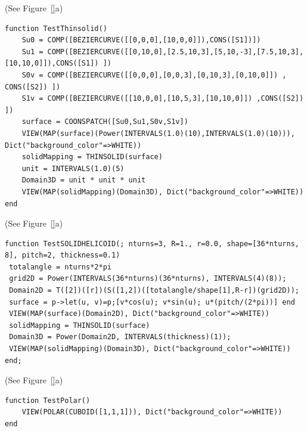 \begin{coding}[Algebraic computation of FE = $\delta_1$]
\begin{condition}[(aaaaaaa] (See Figure~\ref{}a)\
\begin{lstlisting}[language=JuliaLocal, style=julia, mathescape=true]
function TestThinsolid()
	Su0 = COMP([BEZIERCURVE([[0,0,0],[10,0,0]]),CONS([S1])])
	Su1 = COMP([BEZIERCURVE([[0,10,0],[2.5,10,3],[5,10,-3],[7.5,10,3],[10,10,0]]),CONS([S1]) ])
	S0v = COMP([BEZIERCURVE([[0,0,0],[0,0,3],[0,10,3],[0,10,0]]) , CONS([S2]) ]) 
	S1v = COMP([BEZIERCURVE([[10,0,0],[10,5,3],[10,10,0]]) ,CONS([S2]) ])
	surface = COONSPATCH([Su0,Su1,S0v,S1v])
	VIEW(MAP(surface)(Power(INTERVALS(1.0)(10),INTERVALS(1.0)(10))), Dict("background_color"=>WHITE))
	solidMapping = THINSOLID(surface)
	unit = INTERVALS(1.0)(5)
	Domain3D = unit * unit * unit
	VIEW(MAP(solidMapping)(Domain3D), Dict("background_color"=>WHITE))
end
\end{lstlisting}
\end{condition}

\begin{condition}[(aaaaaaa] (See Figure~\ref{}a)\
\begin{lstlisting}[language=JuliaLocal, style=julia, mathescape=true]
function TestSOLIDHELICOID(; nturns=3, R=1., r=0.0, shape=[36*nturns, 8], pitch=2, thickness=0.1)
 totalangle = nturns*2*pi
 grid2D = Power(INTERVALS(36*nturns)(36*nturns), INTERVALS(4)(8));
 Domain2D = T([2])([r])(S([1,2])([totalangle/shape[1],R-r])(grid2D));
 surface = p->let(u, v)=p;[v*cos(u); v*sin(u); u*(pitch/(2*pi))] end
 VIEW(MAP(surface)(Domain2D), Dict("background_color"=>WHITE))
 solidMapping = THINSOLID(surface)
 Domain3D = Power(Domain2D, INTERVALS(thickness)(1));
 VIEW(MAP(solidMapping)(Domain3D), Dict("background_color"=>WHITE))
end;
\end{lstlisting}
\end{condition}



\begin{condition}[(aaaaaaa] (See Figure~\ref{}a)\
\begin{lstlisting}[language=JuliaLocal, style=julia, mathescape=true]
function TestPolar()
	VIEW(POLAR(CUBOID([1,1,1])), Dict("background_color"=>WHITE))
end
\end{lstlisting}
\end{condition}


\end{coding}
